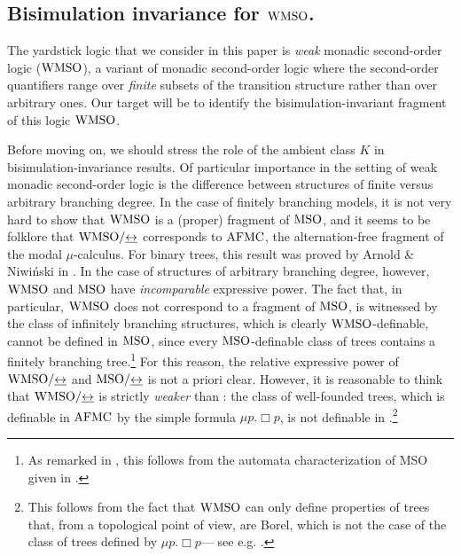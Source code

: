 \subsection{Bisimulation invariance for $\mathrm{WMSO}$.}
The yardstick logic that we consider in this paper is \emph{weak} monadic
second-order logic ($\mathrm{WMSO}$), a variant of monadic second-order logic where
the second-order quantifiers range over \emph{finite} subsets of the
transition structure rather than over arbitrary ones.
Our target will be to identify the bisimulation-invariant fragment of this
logic $\mathrm{WMSO}$.

Before moving on, we should stress the role of the ambient class $K$ in
bisimulation-invariance results.
Of particular importance in the setting of weak monadic second-order logic is
the difference between structures of finite versus arbitrary branching degree.
In the case of finitely branching models, it is not very hard to show that
$\mathrm{WMSO}$ is a (proper) fragment of $\mathrm{MSO}$, and it seems to be folklore that
$\mathrm{WMSO}/{\mathrel{\underline{\leftrightarrow}}}$ corresponds to $\mathrm{AFMC}$, the alternation-free fragment of the
modal $\mu$-calculus.
For binary trees, this result was proved by Arnold \& Niwi{\'n}ski in
\cite{ArnoldN01}.
In the case of structures of arbitrary branching degree, however, $\mathrm{WMSO}$
and $\mathrm{MSO}$ have \emph{incomparable} expressive power.
The fact that, in particular, $\mathrm{WMSO}$ does not correspond to a fragment of
$\mathrm{MSO}$, is witnessed by the class of infinitely branching structures, which
is clearly $\mathrm{WMSO}$-definable, cannot be defined in $\mathrm{MSO}$, since every
$\mathrm{MSO}$-definable class of trees contains a finitely branching
tree.\footnote{As remarked in \cite{CateF11}, this follows from the automata characterization of MSO given in \cite{Walukiewicz96}.} %
For this reason, the relative expressive power of $\mathrm{WMSO}/{\mathrel{\underline{\leftrightarrow}}}$ and
$\mathrm{MSO}/{\mathrel{\underline{\leftrightarrow}}}$ is not a priori clear.
However, it is reasonable to think that $\mathrm{WMSO}/{\mathrel{\underline{\leftrightarrow}}}$ is strictly \emph{weaker} than \afmc: the class of well-founded trees, which is definable in $\mathrm{AFMC}$ by
the simple formula $\mu p. \Box p$, is not definable in \wmso.\footnote{This follows from the fact that $\mathrm{WMSO}$ can only define properties of trees that, from a topological point of view, are Borel, which is not the case of the class of trees defined by $\mu p. \Box p$--- see e.g. \cite{CateF11}.}
